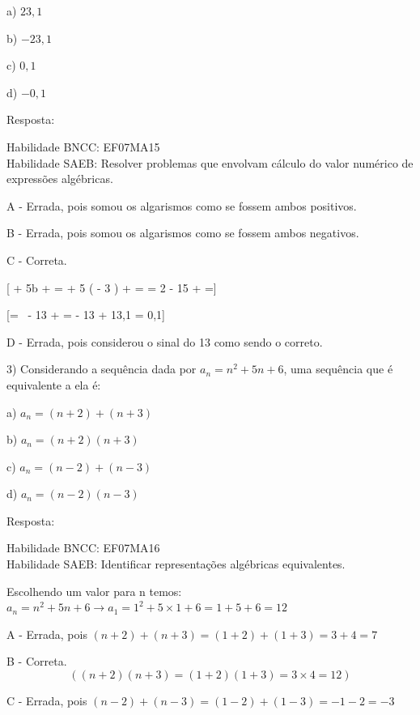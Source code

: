 a) \(23,1\)

b) \(- 23,1\)

c) \(0,1\)

d) \(- 0,1\)

Resposta:

Habilidade BNCC: EF07MA15\\
Habilidade SAEB: Resolver problemas que envolvam cálculo do valor
numérico de expressões algébricas.

A - Errada, pois somou os algarismos como se fossem ambos positivos.

B - Errada, pois somou os algarismos como se fossem ambos negativos.

C - Correta.

[ + 5b +  =  + 5 \times \left( - 3 \right) +  = = 2 - 15 +  =]

[= \  - 13 +  = - 13 + 13,1 = 0,1]

D - Errada, pois considerou o sinal do 13 como sendo o correto.

3) Considerando a sequência dada por \(a_{n} = n^{2} + 5n + 6\), uma
sequência que é equivalente a ela é:

a) \(a_{n} = (n + 2) + (n + 3)\)

b) \(a_{n} = (n + 2)(n + 3)\)

c) \(a_{n} = (n - 2) + (n - 3)\)

d) \(a_{n} = (n - 2)(n - 3)\)

Resposta:

Habilidade BNCC: EF07MA16\\
Habilidade SAEB: Identificar representações algébricas equivalentes.

Escolhendo um valor para n
temos:\(a_{n} = n^{2} + 5n + 6 \rightarrow a_{1} = 1^{2} + 5 \times 1 + 6 = 1 + 5 + 6 = 12\ \)

A - Errada, pois
\(\left( n + 2 \right) + \left( n + 3 \right) = \left( 1 + 2 \right) + \left( 1 + 3 \right) = 3 + 4 = 7\)

B - Correta.
$$(( n + 2)(n + 3) = \left( 1 + 2 \right)\left( 1 + 3 \right) = 3 \times 4 = 12)$$


C - Errada, pois
\(\left( n - 2 \right) + \left( n - 3 \right) = \left( 1 - 2 \right) + \left( 1 - 3 \right) = - 1 - 2 = - 3\)

